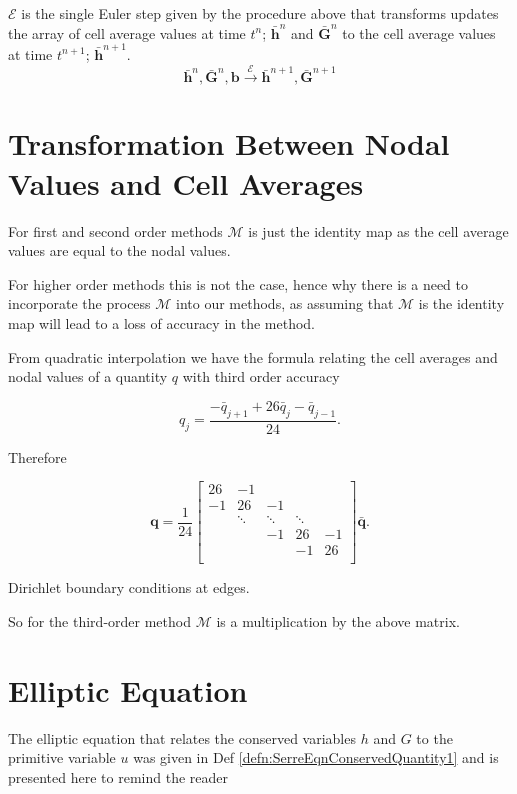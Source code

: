 \begin{defn}
	\label{defn:EulerStep}
	$\mathcal{E}$ is the single Euler step given by the procedure above that transforms updates the array of cell average values at time $t^n$; $\bar{\boldsymbol{h}}^n$ and $\bar{\boldsymbol{G}}^n$ to the cell average values at time $t^{n+1}$; $\bar{\boldsymbol{h}}^{n+ 1}$.
	$$\bar{\boldsymbol{h}}^n, \bar{\boldsymbol{G}}^n,  {\boldsymbol{b}} \xrightarrow{\mathcal{\mathcal{E}}}  \bar{\boldsymbol{h}}^{n+ 1}, \bar{\boldsymbol{G}}^{n+ 1}  $$
\end{defn}

\section{Transformation Between Nodal Values and Cell Averages}
For first and second order methods $\mathcal{M}$ is just the identity map as the cell average values are equal to the nodal values.

For higher order methods this is not the case, hence why there is a need to incorporate the process $\mathcal{M}$ into our methods, as assuming that $\mathcal{M}$ is the identity map will lead to a loss of accuracy in the method. 

From quadratic interpolation we have the formula relating the cell averages and nodal values of a quantity  $q$ with third order accuracy

\begin{equation*}
q_j = \frac{-\bar{q}_{j+ 1} + 26\bar{q}_{j} - \bar{q}_{j - 1}}{24}.
\end{equation*}

Therefore 

\begin{equation*}
\boldsymbol{q} = \frac{1}{24}
\begin{bmatrix}
26  & -1  & & & \\
-1  & 26  & -1  &  & \\
 & \ddots & \ddots &  \ddots & \\
  &  & -1 & 26  &  -1\\
 &   &  & -1 & 26  \\
\end{bmatrix}
 \bar{\boldsymbol{q}}.
\end{equation*}

Dirichlet boundary conditions at edges.

So for the third-order method $\mathcal{M}$ is a multiplication by the above matrix. 

\section{Elliptic Equation}
The elliptic equation that relates the conserved variables $h$ and $G$ to the primitive variable $u$ was given in Def \ref{defn:SerreEqnConservedQuantity1} and is presented here to remind the reader

